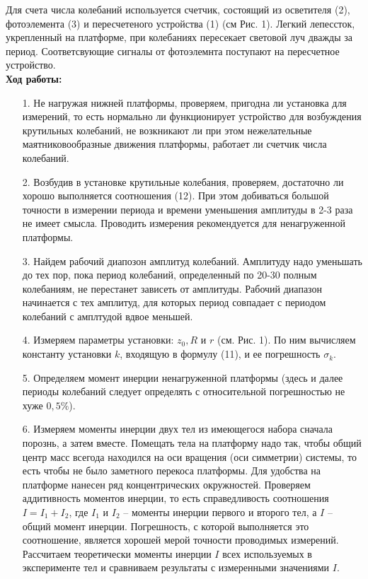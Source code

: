 \documentclass[a4paper,12pt]{article} %
\begin{document}
Для счета числа колебаний используется счетчик, состоящий из осветителя (2), фотоэлемента (3) и пересчетеного устройства (1) (см Рис. 1). Легкий лепессток, укрепленный на платформе, при колебаниях пересекает световой луч дважды за период. Соответсвующие сигналы от фотоэлемнта поступают на пересчетное устройство.\\
\textbf{Ход работы:}
\begin{itemize}
\item[1.] Не нагружая нижней платформы, проверяем, пригодна ли установка для измерений, то есть нормально ли функционирует устройство для возбуждения крутильных колебаний, не возкникают ли при этом нежелательные маятниковообразные движения платформы, работает ли счетчик числа колебаний.
\item[2.] Возбудив в установке крутильные колебания, проверяем, достаточно ли хорошо выполняется соотношения (12). При этом добиваться большой точности в измерении периода и времени уменьшения амплитуды в 2-3 раза не имеет смысла. Проводить измерения рекомендуется для ненагруженной платформы. 
\item[3.]Найдем рабочий диапозон амплитуд колебаний. Амплитуду надо уменьшать до тех пор, пока период колебаний, определенный по 20-30 полным колебаниям, не перестанет зависеть от амплитуды. Рабочий диапазон начинается с тех амплитуд, для которых период совпадает с периодом колебаний с амплтудой вдвое меньшей.
\item[4.]Измеряем параметры установки: $z_0, R$ и $r$ (см. Рис. 1). По ним вычисляем константу установки $k$, входящую в формулу (11), и ее погрешность $\sigma_k$.
\item[5.] Определяем момент инерции ненагруженной платформы (здесь и далее периоды колебаний следует определять с относительной погрешностью не хуже $0,5\%$).
\item[6.]Измеряем моменты инерции двух тел из имеющегося набора сначала порознь, а затем вместе. Помещать тела на платформу надо так, чтобы общий центр масс всегода находился на оси вращения (оси симметрии) системы, то есть чтобы не было заметного перекоса платформы. Для удобства на платформе нанесен ряд концентрических окружностей. Проверяем аддитивность моментов инерции, то есть справедливость соотношения $I = I_1+I_2$, где $I_1$ и $I_2$ -- моменты инерции первого и второго тел, а $I$ -- общий момент инерции. Погрешность, с которой выполняется это соотношение, является хорошей мерой точности проводимых измерений. Рассчитаем теоретически моменты инерции $I$ всех используемых в эксперименте тел и сравниваем результаты с измеренными значениями $I$.

\end{itemize}
\end{document}
